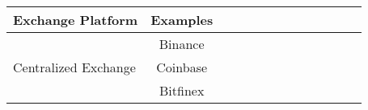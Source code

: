 



\begin{table*}[t]
\centering
\begin{tabular}{|l|c|p{0.4cm}|p{0.4cm}|p{0.4cm}|p{0.4cm}|p{0.4cm}|p{0.4cm}|p{0.4cm}|p{0.4cm}|p{0.4cm}|p{0.4cm}|p{0.4cm}|}

\multicolumn{1}{c}{\textbf{Exchange Platform}} & 
\multicolumn{1}{c}{\textbf{Examples}} & 

\headrow{Non-Custodial} &
\headrow{No Trusted Third Party} & 
\headrow{Fully Autonomous} & 
\headrow{Resilient to Front-running} &


\headrow{Resilient to Server Downtime} & 
\headrow{Resilient to Ethereum Network Congestion} & 
\headrow{High Trade Performance} &

\headrow{Certain Fulfillment} &
\headrow{Low Price Slippage} &
\headrow{No Impermanent Loss} &
\headrow{T+0 Settlement} \\

\hline

%
\multirow{3}{*}{Centralized Exchange}    		&Binance			&\multirow{3}{*}{}		&\multirow{3}{*}{}		&\multirow{3}{*}{}		&\multirow{3}{*}{}		&\multirow{3}{*}{}		&\multirow{3}{*}{\full} 		&\multirow{3}{*}{\full}		&\multirow{3}{*}{}		&\multirow{3}{*}{\full}		&\multirow{3}{*}{\full }		&\multirow{3}{*}{ } 		\\ 
							         &Coinbase			& 						&						&						&						&						&						&						&						&						& 						&						\\
								&Bitfinex     		& 						&						&						&						&						&						&						&						&						& 						&						\\ \hline	


\end{tabular}
\end{table*}
